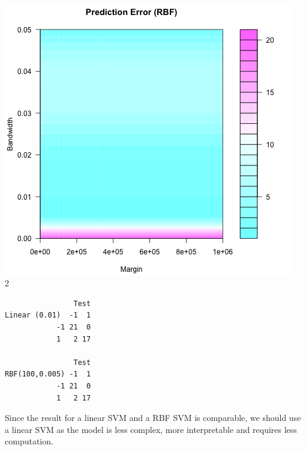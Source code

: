\documentclass[]{../util/ColumbiaAssm}
\begin{document}
\begin{questions}
\begin{solution}
\\\includegraphics[scale=0.7]{Contour}
\\2 
\begin{lstlisting}
                Test
Linear (0.01)  -1  1
            -1 21  0
            1   2 17

                Test
RBF(100,0.005) -1  1
            -1 21  0
            1   2 17
\end{lstlisting}
Since the result for a linear SVM and a RBF SVM is comparable, we should use a linear SVM as the model is less complex, more interpretable and requires less computation.
\end{solution}

\end{questions}

\end{document}
